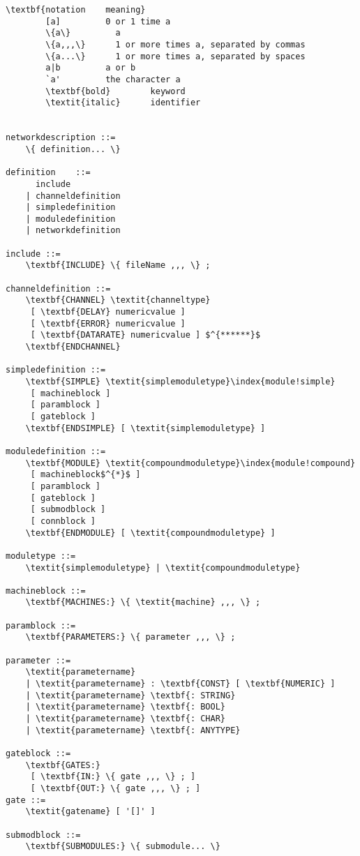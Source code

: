 \begin{Verbatim}[commandchars=\\\{\}]
        \textbf{notation    meaning}
        [a]         0 or 1 time a
        \{a\}         a
        \{a,,,\}      1 or more times a, separated by commas
        \{a...\}      1 or more times a, separated by spaces
        a|b         a or b
        `a'         the character a
        \textbf{bold}        keyword
        \textit{italic}      identifier


networkdescription ::=
    \{ definition... \}

definition    ::=
      include
    | channeldefinition
    | simpledefinition
    | moduledefinition
    | networkdefinition

include ::=
    \textbf{INCLUDE} \{ fileName ,,, \} ;

channeldefinition ::=
    \textbf{CHANNEL} \textit{channeltype}
     [ \textbf{DELAY} numericvalue ]
     [ \textbf{ERROR} numericvalue ]
     [ \textbf{DATARATE} numericvalue ] $^{******}$
    \textbf{ENDCHANNEL}

simpledefinition ::=
    \textbf{SIMPLE} \textit{simplemoduletype}\index{module!simple}
     [ machineblock ]
     [ paramblock ]
     [ gateblock ]
    \textbf{ENDSIMPLE} [ \textit{simplemoduletype} ]

moduledefinition ::=
    \textbf{MODULE} \textit{compoundmoduletype}\index{module!compound}
     [ machineblock$^{*}$ ]
     [ paramblock ]
     [ gateblock ]
     [ submodblock ]
     [ connblock ]
    \textbf{ENDMODULE} [ \textit{compoundmoduletype} ]

moduletype ::=
    \textit{simplemoduletype} | \textit{compoundmoduletype}

machineblock ::=
    \textbf{MACHINES:} \{ \textit{machine} ,,, \} ;

paramblock ::=
    \textbf{PARAMETERS:} \{ parameter ,,, \} ;

parameter ::=
    \textit{parametername}
    | \textit{parametername} : \textbf{CONST} [ \textbf{NUMERIC} ]
    | \textit{parametername} \textbf{: STRING}
    | \textit{parametername} \textbf{: BOOL}
    | \textit{parametername} \textbf{: CHAR}
    | \textit{parametername} \textbf{: ANYTYPE}

gateblock ::=
    \textbf{GATES:}
     [ \textbf{IN:} \{ gate ,,, \} ; ]
     [ \textbf{OUT:} \{ gate ,,, \} ; ]
gate ::=
    \textit{gatename} [ '[]' ]

submodblock ::=
    \textbf{SUBMODULES:} \{ submodule... \}


\end{Verbatim}
